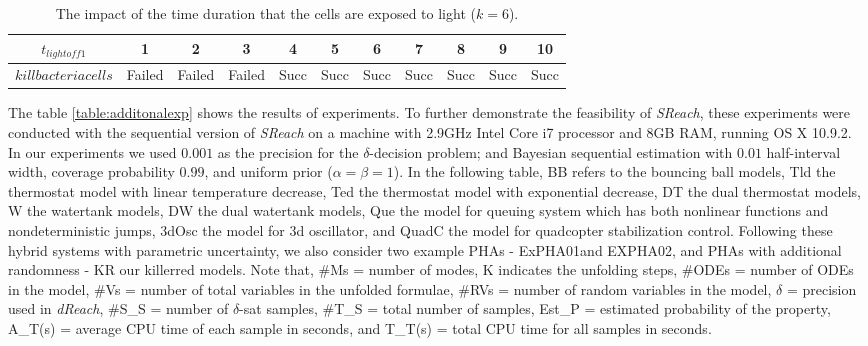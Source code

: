 \begin{table*}[th!]
\captionsetup{font=scriptsize}
\centering
    \begin{tabular}{|c|c|c|c|c|c|c|c|c|c|c|}
    \hline
    $t_{lightoff1}$ & 1 & 2 & 3 & 4 & 5 & 6 & 7 & 8 & 9 & 10 \\ \hline
    $kill bacteria cells$ & Failed  & Failed    &  Failed   & Succ   & Succ & Succ & Succ & Succ & Succ & Succ    \\ \hline
    \end{tabular}
    \caption{The impact of the time duration that the cells are exposed to light ($k=6$).}
    \label{table:kr03}
\end{table*}

The table \ref{table:additonalexp} shows the results of experiments. To further demonstrate the feasibility of {\it SReach}, these experiments were conducted with the sequential version of {\it SReach} on a machine with 2.9GHz Intel Core i7 processor and 8GB RAM, running OS X 10.9.2. In our experiments we used $0.001$ as the precision for the $\delta$-decision problem; and Bayesian sequential estimation with $0.01$ half-interval width, coverage probability $0.99$, and uniform prior ($\alpha = \beta = 1$). In the following table, BB refers to the bouncing ball models, Tld the thermostat model with linear temperature decrease, Ted the thermostat model with exponential decrease, DT the dual thermostat models, W the watertank models, DW the dual watertank models, Que the model for queuing system which has both nonlinear functions and nondeterministic jumps, 3dOsc the model for 3d oscillator, and QuadC the model for quadcopter stabilization control. Following these hybrid systems with parametric uncertainty, we also consider two example PHAs - ExPHA01and EXPHA02, and PHAs with additional randomness - KR our killerred models. Note that, \#Ms = number of modes, K indicates the unfolding steps, \#ODEs = number of ODEs in the model, \#Vs = number of total variables in the unfolded formulae, \#RVs = number of random variables in the model, $\delta$ = precision used in {\it dReach}, \#S\_S = number of $\delta$-sat samples, \#T\_S = total number of samples, Est\_P = estimated probability of the property, A\_T(s) = average CPU time of each sample in seconds, and T\_T(s) = total CPU time for all samples in seconds.

